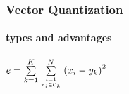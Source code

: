 


\begin{frame}
\frametitle{Vector Quantization}
\framesubtitle{types and advantages}
\logoCSIPCPL\mypagenum
$e = \KmeansError$
\end{frame}





